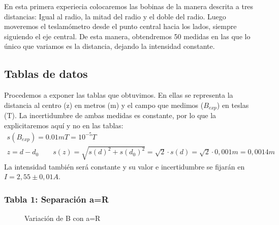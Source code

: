 \documentclass[12pt, a4paper, titlepage]{article}
\begin{document}
  En esta primera experiecia colocaremos las bobinas de la manera descrita a tres distancias: Igual al radio, la mitad del radio y el doble del radio. Luego moveremos el teslamómetro desde el punto central hacia los lados, siempre siguiendo el eje central. De esta manera, obtendremos 50 medidas en las que lo único que variamos es la distancia, dejando la intensidad constante.

  \subsection{Tablas de datos}

  Procedemos a exponer las tablas que obtuvimos. En ellas se representa la distancia al centro (z) en metros (m) y el campo que medimos ($B_{exp}$) en teslas (T). La incertidumbre de ambas medidas es constante, por lo que la explicitaremos aquí y no en las tablas:
  \begin{gather}
    s(B_{exp}) = 0.01mT = 10^{-5}T \\
    z = d - d_0 \qquad s(z) = \sqrt{s(d)^2 + s(d_0)^2} = \sqrt{2} \cdot s(d) = \sqrt{2} \cdot 0,001m = 0,0014m
  \end{gather}
  La intensidad también será constante y su valor e incertidumbre se fijarán en $I = 2,55 \pm 0,01 A$.

  \subsubsection{Tabla 1: Separación a=R}

  \begin{figure}[H]
    \begin{table}[H]
      \centering
       \quad
    \end{table}
    \caption{Variación de B con a=R}
  \end{figure}
\end{document}
